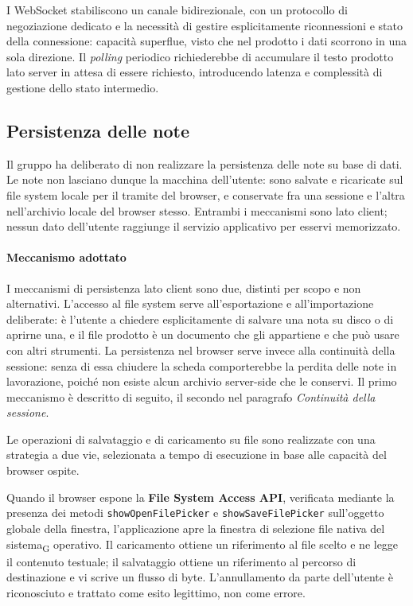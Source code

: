 \documentclass[a4paper, 10pt]{article}
\newenvironment{alternative}{%
  \begin{description}[
    style=nextline,
    leftmargin=0pt,
    labelindent=0pt,
    labelsep=0pt,
    font=\normalfont\bfseries,
    topsep=0.6em,
    itemsep=0.9em,
    parsep=0pt
  ]%
}{%
  \end{description}%
}
\newcommand{\altitem}[1]{\item[\textbullet\enspace #1]}
\begin{document}
\begin{alternative}
\altitem{WebSocket e polling al posto dei Server-Sent Events}
I WebSocket stabiliscono un canale bidirezionale, con un protocollo di negoziazione dedicato e la necessità di gestire esplicitamente riconnessioni e stato della connessione: capacità superflue, visto che nel prodotto i dati scorrono in una sola direzione. Il \textit{polling} periodico richiederebbe di accumulare il testo prodotto lato server in attesa di essere richiesto, introducendo latenza e complessità di gestione dello stato intermedio.

\end{alternative}

\subsection{Persistenza delle note}
\label{sec:persistenza}
Il gruppo ha deliberato di non realizzare la persistenza delle note su base di dati. Le note non lasciano dunque la macchina dell'utente: sono salvate e ricaricate sul file system locale per il tramite del browser, e conservate fra una sessione e l'altra nell'archivio locale del browser stesso. Entrambi i meccanismi sono lato client; nessun dato dell'utente raggiunge il servizio applicativo per esservi memorizzato.

\paragraph{Meccanismo adottato}
I meccanismi di persistenza lato client sono due, distinti per scopo e non alternativi. L'accesso al file system serve all'esportazione e all'importazione deliberate: è l'utente a chiedere esplicitamente di salvare una nota su disco o di aprirne una, e il file prodotto è un documento che gli appartiene e che può usare con altri strumenti. La persistenza nel browser serve invece alla continuità della sessione: senza di essa chiudere la scheda comporterebbe la perdita delle note in lavorazione, poiché non esiste alcun archivio server-side che le conservi. Il primo meccanismo è descritto di seguito, il secondo nel paragrafo \textit{Continuità della sessione}.

Le operazioni di salvataggio e di caricamento su file sono realizzate con una strategia a due vie, selezionata a tempo di esecuzione in base alle capacità del browser ospite.

Quando il browser espone la \textbf{File System Access API}, verificata mediante la presenza dei metodi \texttt{showOpenFilePicker} e \texttt{showSaveFilePicker} sull'oggetto globale della finestra, l'applicazione apre la finestra di selezione file nativa del sistema\textsubscript{G} operativo. Il caricamento ottiene un riferimento al file scelto e ne legge il contenuto testuale; il salvataggio ottiene un riferimento al percorso di destinazione e vi scrive un flusso di byte. L'annullamento da parte dell'utente è riconosciuto e trattato come esito legittimo, non come errore.
\end{document}
